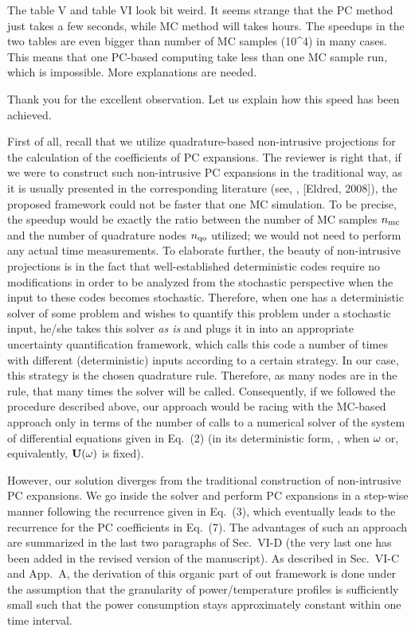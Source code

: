 \begin{reviewer}
The table V and table VI look  bit weird.  It seems strange that the PC method just takes a few seconds, while MC method will takes hours. The speedups in the two tables  are even bigger than number of MC samples (10\^{}4) in many cases. This means that one PC-based computing take less than one MC sample run, which is impossible.  More explanations are needed.
\end{reviewer}
\begin{authors}
Thank you for the excellent observation.
Let us explain how this speed has been achieved.

First of all, recall that we utilize quadrature-based non-intrusive projections for the calculation of the coefficients of PC expansions.
The reviewer is right that, if we were to construct such non-intrusive PC expansions in the traditional way, as it is usually presented in the corresponding literature (see, \eg, [Eldred, 2008]), the proposed framework could not be faster that one MC simulation.
To be precise, the speedup would be exactly the ratio between the number of MC samples ${n_\text{mc}}$ and the number of quadrature nodes ${n_\text{qo}}$ utilized; we would not need to perform any actual time measurements.
To elaborate further, the beauty of non-intrusive projections is in the fact that well-established deterministic codes require no modifications in order to be analyzed from the stochastic perspective when the input to these codes becomes stochastic.
Therefore, when one has a deterministic solver of some problem and wishes to quantify this problem under a stochastic input, he/she takes this solver \emph{as is} and plugs it in into an appropriate uncertainty quantification framework, which calls this code a number of times with different (deterministic) inputs according to a certain strategy.
In our case, this strategy is the chosen quadrature rule.
Therefore, as many nodes are in the rule, that many times the solver will be called.
Consequently, if we followed the procedure described above, our approach would be racing with the MC-based approach only in terms of the number of calls to a numerical solver of the system of differential equations given in Eq.~(2) (in its deterministic form, \ie, when $\omega$ or, equivalently, $\mathbf{U}(\omega)$ is fixed).

However, our solution diverges from the traditional construction of non-intrusive PC expansions.
We go inside the solver and perform PC expansions in a step-wise manner following the recurrence given in Eq.~(3), which eventually leads to the recurrence for the PC coefficients in Eq.~(7).
The advantages of such an approach are summarized in the last two paragraphs of Sec.~VI-D (the very last one has been added in the revised version of the manuscript).
As described in Sec.~VI-C and App.~A, the derivation of this organic part of out framework is done under the assumption that the granularity of power/temperature profiles is sufficiently small such that the power consumption stays approximately constant within one time interval.


\end{authors}
